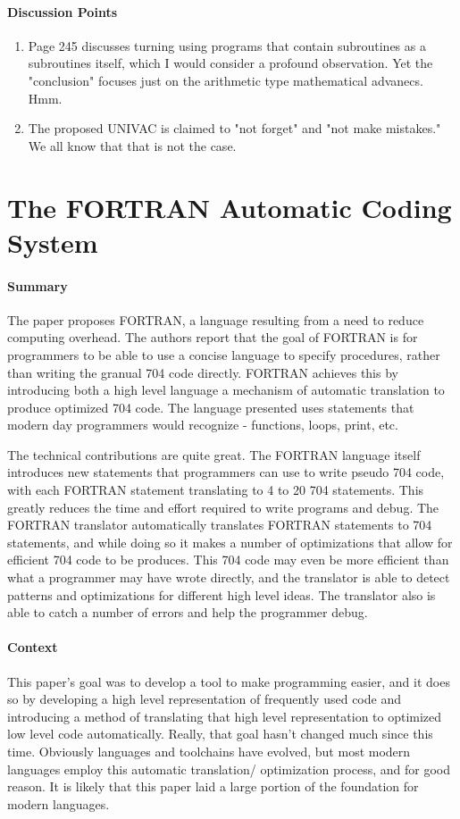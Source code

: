 \paragraph{\textbf{Discussion Points}}
\begin{enumerate}
    \item Page 245 discusses turning using programs that contain subroutines as
    a subroutines itself, which I would consider a profound observation. Yet the
    "conclusion" focuses just on the arithmetic type mathematical advanecs. Hmm.
    \item The proposed UNIVAC is claimed to "not forget" and "not make
    mistakes." We all know that that is not the case.
\end{enumerate}


\section {The FORTRAN Automatic Coding System \cite{backus1957fortran}}

\paragraph{\textbf{Summary}}
The paper proposes FORTRAN, a language resulting from a need to reduce computing
overhead. The authors report that the goal of FORTRAN is for programmers to be
able to use a concise language to specify procedures, rather than writing the
granual 704 code directly. FORTRAN achieves this by introducing both a high
level language a mechanism of automatic translation to produce optimized 704
code. The language presented uses statements that modern day programmers would
recognize - functions, loops, print, etc.

The technical contributions are quite great. The FORTRAN language itself
introduces new statements that programmers can use to write pseudo 704 code,
with each FORTRAN statement translating to 4 to 20 704 statements. This greatly
reduces the time and effort required to write programs and debug. The FORTRAN
translator automatically translates FORTRAN statements to 704 statements, and
while doing so it makes a number of optimizations that allow for efficient 704
code to be produces. This 704 code may even be more efficient than what a
programmer may have wrote directly, and the translator is able to detect
patterns and optimizations for different high level ideas. The translator also
is able to catch a number of errors and help the programmer debug.
\paragraph{\textbf{Context}}
This paper's goal was to develop a tool to make programming easier, and it does
so by developing a high level representation of frequently used code and
introducing a method of translating that high level representation to optimized
low level code automatically. Really, that goal hasn't changed much since this
time. Obviously languages and toolchains have evolved, but most modern languages
employ this automatic translation/ optimization process, and for good reason. It
is likely that this paper laid a large portion of the foundation for modern
languages.

